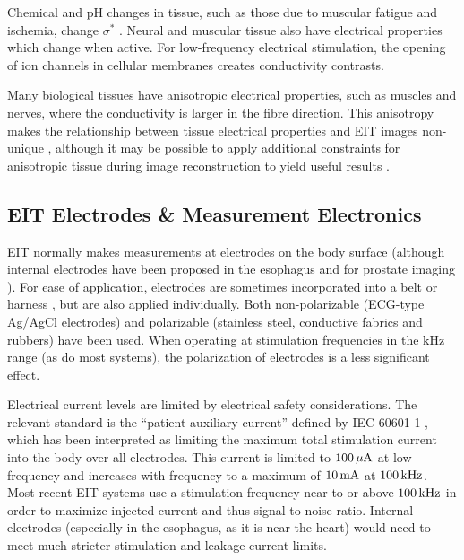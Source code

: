 \documentclass[10pt,journal]{IEEEtran}\def\TBLWIDA{15mm}\def\TBLWIDB{60mm}
\begin{document}
Chemical and pH changes in tissue, such as those due to
muscular fatigue and ischemia, change $\sigma^*$
\cite{Packham2012Frequency}.
Neural and muscular tissue also have electrical properties
which change when active.
For low-frequency electrical stimulation, the opening of
ion channels in cellular membranes \cite{Aristovich2014Neural}
creates conductivity contrasts. 

Many biological tissues have anisotropic electrical properties,
such as muscles and nerves, where the conductivity
is larger in the fibre direction.
This anisotropy makes the relationship between
tissue electrical properties and EIT images
non-unique \cite{Lee1989Anisotopic}, although
it may be possible to apply additional constraints for
anisotropic tissue
during image reconstruction to yield useful results
 \cite{Lionheart2010Finite}.

\subsection{EIT Electrodes \& Measurement Electronics}


EIT normally makes measurements at electrodes on the body surface 
(although internal electrodes have been proposed in the
esophagus \cite{Schuessler1995Esophageal}
 and for prostate imaging \cite{Borsic2009Prostate}).
For ease of application, electrodes are sometimes incorporated into a belt or
harness \cite{Waldmann2017Interface}, but are also applied individually. 
Both non-polarizable (ECG-type Ag/AgCl electrodes) and 
         polarizable (stainless steel, conductive fabrics and rubbers)
have been used. When operating at stimulation frequencies in
the kHz range (as do most systems), the polarization of electrodes is
a less significant effect.

Electrical current levels are limited by electrical safety considerations.
The relevant standard is the ``patient auxiliary current''
defined by IEC 60601-1 \cite{IEC60601}, which has been interpreted
as limiting the maximum total stimulation current into the body over all
electrodes. 
This current is limited to $\rm 100\,\mu A$ at low frequency
and increases with frequency to a maximum of $\rm 10\,mA$ at $\rm 100\,kHz$.
Most recent EIT systems use a stimulation frequency 
near to or above $\rm 100\,kHz$ in order to maximize
injected current and thus signal to noise ratio.
Internal electrodes \cite{Schuessler1995Esophageal}
(especially in the esophagus, as it is near the heart)
would need to meet much stricter stimulation and leakage current limits.
\end{document}

